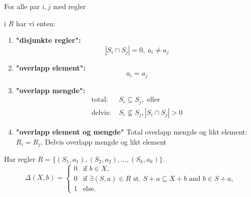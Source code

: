 

For alle par $i,j$ med regler 

i $R$ har vi enten:
\begin{enumerate}
  \item \textbf{"disjunkte regler":} $$|S_i \cap S_j| = 0,\ a_i \neq a_j$$
  \item \textbf{"overlapp element":} $$a_i = a_j$$
  \item \textbf{"overlapp mengde":}
  $$
  \begin{aligned}
    \mbox{total: }  &S_i \subseteq S_j, \mbox{ eller} \\
    \mbox{delvis: } &S_i \not \subseteq S_j, |S_i \cap S_j| > 0
  \end{aligned}
  $$
  \item \textbf{"overlapp element og mengde"}
  \subitem Total overlapp mengde og likt element: $R_i = R_j$.
  \subitem Delvis overlapp mengde og likt element
\end{enumerate}



Har regler $R = \{ (S_1, a_1), (S_2, a_2), \dots, (S_k, a_k) \}$. 
$$
\Delta(X, b) = \begin{cases}
  0 & \mbox{if } b \in X, \\
  0 & \mbox{if } \exists(S, a) \in R \mbox{ st. } S+a \subseteq X+b \mbox{ and } b \in S+a, \\
  1 & \mbox{else.}
\end{cases}
$$
